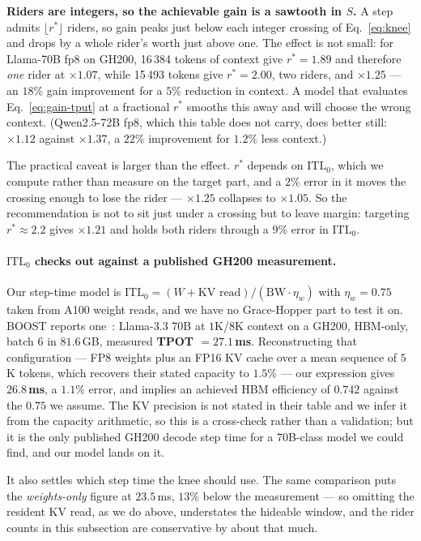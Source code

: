 \textbf{Riders are integers, so the achievable gain is a sawtooth in $S$.} A step
admits $\lfloor r^{*} \rfloor$ riders, so gain peaks just below each integer
crossing of Eq.~\ref{eq:knee} and drops by a whole rider's worth just above one.
The effect is not small: for Llama-70B fp8 on GH200, 16\,384 tokens of context give
$r^{*} = 1.89$ and therefore \emph{one} rider at $\times 1.07$, while 15\,493
tokens give $r^{*} = 2.00$, two riders, and $\times 1.25$ --- an $18\%$ gain
improvement for a $5\%$ reduction in context. A model that evaluates
Eq.~\ref{eq:gain-tput} at a fractional $r^{*}$ smooths this away and will choose
the wrong context. (Qwen2.5-72B fp8, which this table does not carry, does better
still: $\times 1.12$ against $\times 1.37$, a $22\%$ improvement for $1.2\%$ less
context.)

The practical caveat is larger than the effect. $r^{*}$ depends on
$\mathrm{ITL}_0$, which we compute rather than measure on the target part, and a
$2\%$ error in it moves the crossing enough to lose the rider --- $\times 1.25$
collapses to $\times 1.05$. So the recommendation is not to sit just under a
crossing but to leave margin: targeting $r^{*} \approx 2.2$ gives $\times 1.21$ and
holds both riders through a $9\%$ error in $\mathrm{ITL}_0$.

\paragraph{$\mathrm{ITL}_0$ checks out against a published GH200 measurement.}
Our step-time model is $\mathrm{ITL}_0 = (W + \text{KV read})/(\mathrm{BW} \cdot
\eta_w)$ with $\eta_w = 0.75$ taken from A100 weight reads, and we have no
Grace-Hopper part to test it on. BOOST reports one~\cite{boost}: Llama-3.3 70B at
$1$K/$8$K context on a GH200, HBM-only, batch $6$ in $81.6$\,GB, measured
\textbf{TPOT $= 27.1$\,ms}. Reconstructing that configuration --- FP8 weights plus
an FP16 KV cache over a mean sequence of $5$K tokens, which recovers their stated
capacity to $1.5\%$ --- our expression gives $\mathbf{26.8}$\,\textbf{ms}, a
$1.1\%$ error, and implies an achieved HBM efficiency of $0.742$ against the
$0.75$ we assume. The KV precision is not stated in their table and we infer it
from the capacity arithmetic, so this is a cross-check rather than a validation;
but it is the only published GH200 decode step time for a 70B-class model we could
find, and our model lands on it.

It also settles which step time the knee should use. The same comparison puts the
\emph{weights-only} figure at $23.5$\,ms, $13\%$ below the measurement --- so
omitting the resident KV read, as we do above, understates the hideable window, and
the rider counts in this subsection are conservative by about that much.

